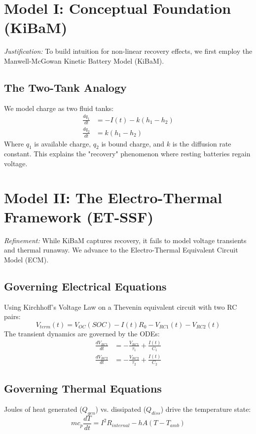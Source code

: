 \documentclass[12pt]{article}
\begin{document}
\section{Model I: Conceptual Foundation (KiBaM)}
\textit{Justification:} To build intuition for non-linear recovery effects, we first employ the Manwell-McGowan Kinetic Battery Model (KiBaM).

\subsection{The Two-Tank Analogy}
We model charge as two fluid tanks:
\begin{align}
    \frac{dq_1}{dt} &= -I(t) - k(h_1 - h_2) \\
    \frac{dq_2}{dt} &= k(h_1 - h_2)
\end{align}
Where $q_1$ is available charge, $q_2$ is bound charge, and $k$ is the diffusion rate constant. This explains the "recovery" phenomenon where resting batteries regain voltage.

\section{Model II: The Electro-Thermal Framework (ET-SSF)}
\textit{Refinement:} While KiBaM captures recovery, it fails to model voltage transients and thermal runaway. We advance to the Electro-Thermal Equivalent Circuit Model (ECM).

\subsection{Governing Electrical Equations}
Using Kirchhoff's Voltage Law on a Thevenin equivalent circuit with two RC pairs:
\begin{equation}
    V_{term}(t) = V_{OC}(SOC) - I(t)R_0 - V_{RC1}(t) - V_{RC2}(t)
\end{equation}
The transient dynamics are governed by the ODEs:
\begin{align}
    \frac{dV_{RC1}}{dt} &= -\frac{V_{RC1}}{\tau_1} + \frac{I(t)}{C_1} \\
    \frac{dV_{RC2}}{dt} &= -\frac{V_{RC2}}{\tau_2} + \frac{I(t)}{C_2}
\end{align}

\subsection{Governing Thermal Equations}
Joules of heat generated ($Q_{gen}$) vs. dissipated ($Q_{diss}$) drive the temperature state:
\begin{equation}
    m c_p \frac{dT}{dt} = I^2 R_{internal} - hA(T - T_{amb})
\end{equation}
\end{document}
